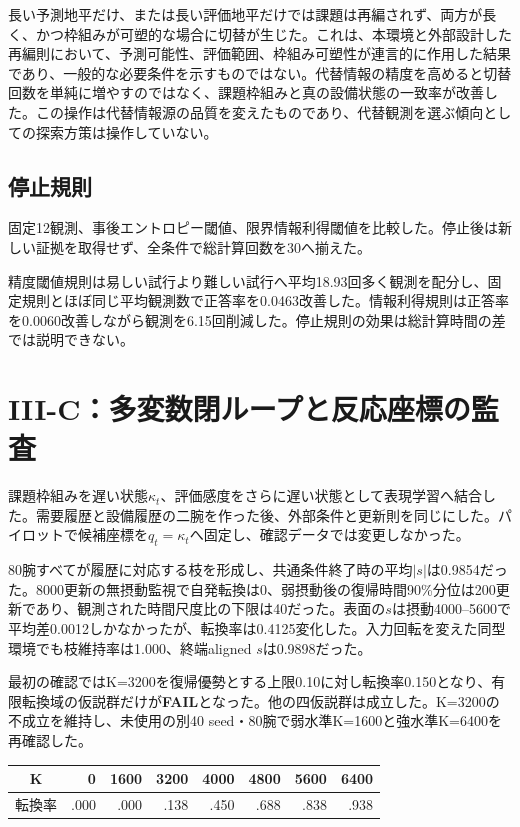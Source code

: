 \documentclass[11pt,a4paper]{ltjsarticle}
\newcommand{\FAIL}{\textcolor{red!65!black}{\textbf{FAIL}}}
\begin{document}
長い予測地平だけ、または長い評価地平だけでは課題は再編されず、両方が長く、かつ枠組みが可塑的な場合に切替が生じた。これは、本環境と外部設計した再編則において、予測可能性、評価範囲、枠組み可塑性が連言的に作用した結果であり、一般的な必要条件を示すものではない。代替情報の精度を高めると切替回数を単純に増やすのではなく、課題枠組みと真の設備状態の一致率が改善した。この操作は代替情報源の品質を変えたものであり、代替観測を選ぶ傾向としての探索方策は操作していない。

\subsection{停止規則}

固定12観測、事後エントロピー閾値、限界情報利得閾値を比較した。停止後は新しい証拠を取得せず、全条件で総計算回数を30へ揃えた。

精度閾値規則は易しい試行より難しい試行へ平均18.93回多く観測を配分し、固定規則とほぼ同じ平均観測数で正答率を0.0463改善した。情報利得規則は正答率を0.0060改善しながら観測を6.15回削減した。停止規則の効果は総計算時間の差では説明できない。

\section{III-C：多変数閉ループと反応座標の監査}

課題枠組みを遅い状態$\kappa_t$、評価感度をさらに遅い状態として表現学習へ結合した。需要履歴と設備履歴の二腕を作った後、外部条件と更新則を同じにした。パイロットで候補座標を$q_t=\kappa_t$へ固定し、確認データでは変更しなかった。

80腕すべてが履歴に対応する枝を形成し、共通条件終了時の平均$|s|$は0.9854だった。8000更新の無摂動監視で自発転換は0、弱摂動後の復帰時間90\%分位は200更新であり、観測された時間尺度比の下限は40だった。表面の$s$は摂動4000--5600で平均差0.0012しかなかったが、転換率は0.4125変化した。入力回転を変えた同型環境でも枝維持率は1.000、終端aligned $s$は0.9898だった。

最初の確認ではK=3200を復帰優勢とする上限0.10に対し転換率0.150となり、有限転換域の仮説群だけが\FAIL となった。他の四仮説群は成立した。K=3200の不成立を維持し、未使用の別40 seed・80腕で弱水準K=1600と強水準K=6400を再確認した。

\begin{center}\small
\begin{tabular}{crrrrrrr}
\toprule
K & 0 & 1600 & 3200 & 4000 & 4800 & 5600 & 6400\\\midrule
転換率 & .000 & .000 & .138 & .450 & .688 & .838 & .938\\\bottomrule
\end{tabular}
\end{center}
\end{document}
